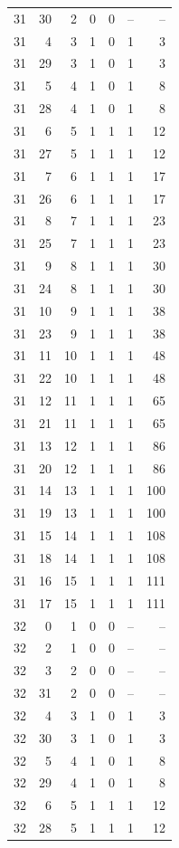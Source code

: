 \begin{longtable}{rrrrrrr}
31 & 30 & 2 & 0 & 0 & -- & --\\
31 & 4 & 3 & 1 & 0 & 1 & 3\\
31 & 29 & 3 & 1 & 0 & 1 & 3\\
31 & 5 & 4 & 1 & 0 & 1 & 8\\
31 & 28 & 4 & 1 & 0 & 1 & 8\\
31 & 6 & 5 & 1 & 1 & 1 & 12\\
31 & 27 & 5 & 1 & 1 & 1 & 12\\
31 & 7 & 6 & 1 & 1 & 1 & 17\\
31 & 26 & 6 & 1 & 1 & 1 & 17\\
31 & 8 & 7 & 1 & 1 & 1 & 23\\
31 & 25 & 7 & 1 & 1 & 1 & 23\\
31 & 9 & 8 & 1 & 1 & 1 & 30\\
31 & 24 & 8 & 1 & 1 & 1 & 30\\
31 & 10 & 9 & 1 & 1 & 1 & 38\\
31 & 23 & 9 & 1 & 1 & 1 & 38\\
31 & 11 & 10 & 1 & 1 & 1 & 48\\
31 & 22 & 10 & 1 & 1 & 1 & 48\\
31 & 12 & 11 & 1 & 1 & 1 & 65\\
31 & 21 & 11 & 1 & 1 & 1 & 65\\
31 & 13 & 12 & 1 & 1 & 1 & 86\\
31 & 20 & 12 & 1 & 1 & 1 & 86\\
31 & 14 & 13 & 1 & 1 & 1 & 100\\
31 & 19 & 13 & 1 & 1 & 1 & 100\\
31 & 15 & 14 & 1 & 1 & 1 & 108\\
31 & 18 & 14 & 1 & 1 & 1 & 108\\
31 & 16 & 15 & 1 & 1 & 1 & 111\\
31 & 17 & 15 & 1 & 1 & 1 & 111\\
32 & 0 & 1 & 0 & 0 & -- & --\\
32 & 2 & 1 & 0 & 0 & -- & --\\
32 & 3 & 2 & 0 & 0 & -- & --\\
32 & 31 & 2 & 0 & 0 & -- & --\\
32 & 4 & 3 & 1 & 0 & 1 & 3\\
32 & 30 & 3 & 1 & 0 & 1 & 3\\
32 & 5 & 4 & 1 & 0 & 1 & 8\\
32 & 29 & 4 & 1 & 0 & 1 & 8\\
32 & 6 & 5 & 1 & 1 & 1 & 12\\
32 & 28 & 5 & 1 & 1 & 1 & 12\\

\end{longtable}
